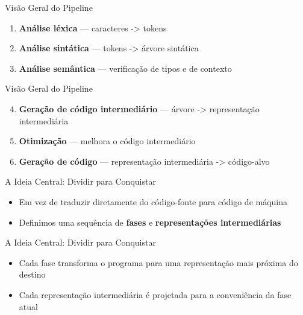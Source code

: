 \begin{frame}{Visão Geral do Pipeline}

    \begin{enumerate}

        \item
        \textbf{Análise léxica} --- caracteres -> tokens
        \item
        \textbf{Análise sintática} --- tokens -> árvore sintática
        \item
        \textbf{Análise semântica} --- verificação de tipos e de contexto
    \end{enumerate}
\end{frame}

\begin{frame}{Visão Geral do Pipeline}

    \begin{enumerate}
        \setcounter{enumi}{3}

        \item
        \textbf{Geração de código intermediário} --- árvore -> representação
        intermediária
        \item
        \textbf{Otimização} --- melhora o código intermediário
        \item
        \textbf{Geração de código} --- representação intermediária ->
        código-alvo
    \end{enumerate}
\end{frame}

\begin{frame}{A Ideia Central: Dividir para Conquistar}

    \begin{itemize}

        \item
        Em vez de traduzir diretamente do código-fonte para código de máquina
        \item
        Definimos uma sequência de \textbf{fases} e \textbf{representações
        intermediárias}
    \end{itemize}
\end{frame}

\begin{frame}{A Ideia Central: Dividir para Conquistar}

    \begin{itemize}

        \item
        Cada fase transforma o programa para uma representação mais próxima do
        destino
        \item
        Cada representação intermediária é projetada para a conveniência da
        fase atual
    \end{itemize}
\end{frame}

